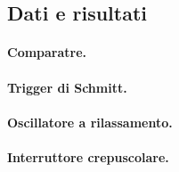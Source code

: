 \subsection{Dati e risultati}

\paragraph{Comparatre.}

\paragraph{Trigger di Schmitt.}

\paragraph{Oscillatore a rilassamento.}

\paragraph{Interruttore crepuscolare.}
